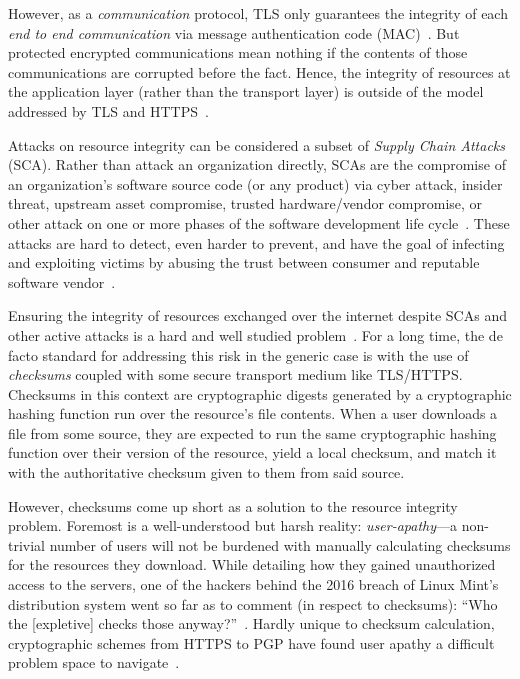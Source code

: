 However, as a \textit{communication} protocol, TLS only guarantees the integrity
of each \textit{end to end communication} via message authentication code
(MAC)~\cite{TLS1.2}. But protected encrypted communications mean nothing if the
contents of those communications are corrupted before the fact. Hence, the
integrity of resources at the application layer (rather than the transport
layer) is outside of the model addressed by TLS and HTTPS~\cite{TLS1.2, HTTPS}.

Attacks on resource integrity can be considered a subset of \emph{Supply Chain
Attacks} (SCA). Rather than attack an organization directly, SCAs are the
compromise of an organization's software source code (or any product) via cyber
attack, insider threat, upstream asset compromise, trusted hardware/vendor
compromise, or other attack on one or more phases of the software development
life cycle~\cite{NIST-SCA}. These attacks are hard to detect, even harder to
prevent, and have the goal of infecting and exploiting victims by abusing the
trust between consumer and reputable software vendor~\cite{SCA}.

Ensuring the integrity of resources exchanged over the internet despite SCAs and
other active attacks is a hard and well studied problem~\cite{MD5Header,
HTTP1.1, HTTPS, SRI, LF, OpenPGP1, DNSSEC, PKI}. For a long time, the de facto
standard for addressing this risk in the generic case is with the use of
\textit{checksums} coupled with some secure transport medium like TLS/HTTPS.
Checksums in this context are cryptographic digests generated by a cryptographic
hashing function run over the resource's file contents. When a user downloads a
file from some source, they are expected to run the same cryptographic hashing
function over their version of the resource, yield a local checksum, and match
it with the authoritative checksum given to them from said source.

However, checksums come up short as a solution to the resource
integrity problem. Foremost is a well-understood but harsh reality: \emph{user-apathy}---a
non-trivial number of users will not be burdened with manually calculating
checksums for the resources they download. While detailing how they gained
unauthorized access to the servers, one of the hackers behind the 2016 breach of
Linux Mint's distribution system went so far as to comment (in respect to
checksums): ``Who the [expletive] checks those anyway?''~\cite{SCA-MINT3}.
Hardly unique to checksum calculation, cryptographic schemes from HTTPS to PGP
have found user apathy a difficult problem space to navigate~\cite{PGPBad,
Clickthrough}.

